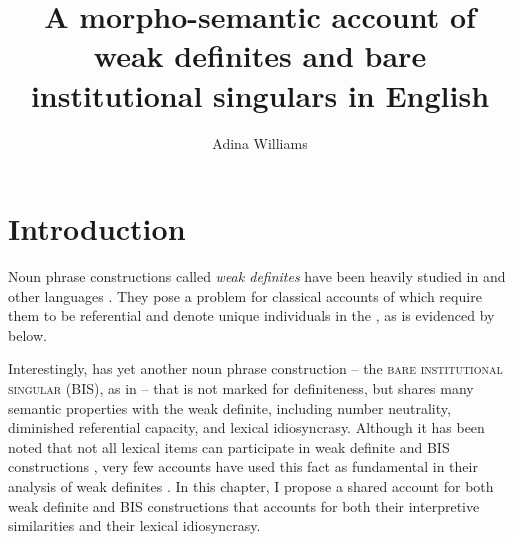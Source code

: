 \documentclass[output=paper,
modfonts
]{langscibook}
\title{A morpho-semantic account of weak definites and bare institutional singulars in English}
\author{Adina Williams\affiliation{New York University}}
\begin{document}
\maketitle

\section{Introduction}\label{sec:williams:1}

Noun phrase constructions called \textit{weak definites} \citep{BirnerWard1994,Poesio1994} have been heavily studied in  \citep{CarlsonSussman2005,CarlsonEtAlii2006,Aguilar-GuevaraZwarsts2011,Aguilar-Guevara2014} and other languages \citep{Schwarz2009,Schwarz2013,Schwarz2014}. They pose a problem for classical accounts of  \citep{Frege1892,Russell1905,Hawkins1978,Sharvy1980,Heim1982} which require them to be referential and denote unique individuals in the , as is evidenced by  below. 

\begin{exe}
\end{exe}

Interestingly,  has yet another noun phrase construction -- the \textsc{bare institutional singular} (BIS), as in  -- that is not  marked for definiteness, but shares many semantic properties with the weak definite, including number neutrality, diminished referential capacity, and lexical idiosyncrasy. Although it has been noted that not all lexical items can participate in weak definite and BIS constructions \citep{Carlson2006b,CarlsonEtAlii2006,Aguilar-GuevaraZwarsts2011,Aguilar-GuevaraEtAlii2014,Aguilar-GuevaraSchulpen2014}, very few accounts have used this fact as fundamental in their analysis of weak definites \citep[but see][]{BaldwinEtAlii2006}. In this chapter, I propose a shared account for both weak definite and BIS constructions that accounts for both their interpretive similarities and their lexical idiosyncrasy. 
\end{document}
